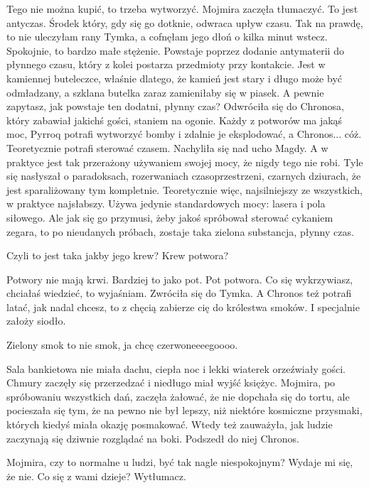 \ds{} Tego nie można kupić, to trzeba wytworzyć. \dm{} Mojmira zaczęła tłumaczyć. \dm{} To jest antyczas. Środek który, gdy się go dotknie, odwraca upływ czasu. 
Tak na prawdę, to nie uleczyłam rany Tymka, a cofnęłam jego dłoń o kilka minut wstecz. Spokojnie, to bardzo małe stężenie.
Powstaje poprzez dodanie antymaterii do płynnego czasu, który z kolei postarza przedmioty przy kontakcie. 
Jest w kamiennej buteleczce, właśnie dlatego, że kamień jest stary i długo może być odmładzany, a szklana butelka zaraz zamieniłaby się w piasek.
A pewnie zapytasz, jak powstaje ten dodatni, płynny czas? 
\dm{} Odwróciła się do Chronosa, który zabawiał jakichś gości, staniem na ogonie. \dm{} 
Każdy z potworów ma jakąś moc, Pyrroq potrafi wytworzyć bomby i zdalnie je eksplodować, a Chronos... cóż. Teoretycznie potrafi sterować czasem.
\dm{} Nachyliła się nad ucho Magdy. \dm{} A w praktyce jest tak przerażony używaniem swojej mocy, że nigdy tego nie robi.
Tyle się nasłyszał o paradoksach, rozerwaniach czasoprzestrzeni, czarnych dziurach, że jest sparaliżowany tym kompletnie.
Teoretycznie więc, najsilniejszy ze wszystkich, w praktyce najsłabszy.
Używa jedynie standardowych mocy: lasera i pola siłowego.
Ale jak się go przymusi, żeby jakoś spróbował sterować cykaniem zegara, to po nieudanych próbach, zostaje taka zielona substancja, płynny czas. \de{}

\ds{} Czyli to jest taka jakby jego krew? Krew potwora? \de{}

\ds{} Potwory nie mają krwi. Bardziej to jako pot. Pot potwora. Co się wykrzywiasz, chciałaś wiedzieć, to wyjaśniam. \dm{} Zwróciła się do Tymka. \dm{}
A Chronos też potrafi latać, jak nadal chcesz, to z chęcią zabierze cię do królestwa smoków. I specjalnie założy siodło. \de{}

\ds{} Zielony smok to nie smok, ja chcę czerwoneeeegoooo. \de{}

\divider{}

Sala bankietowa nie miała dachu, ciepła noc i lekki wiaterek orzeźwiały gości.
Chmury zaczęły się przerzedzać i niedługo miał wyjść księżyc.
Mojmira, po spróbowaniu wszystkich dań, zaczęła żałować, że nie dopchała się do tortu, ale pocieszała się tym, 
że na pewno nie był lepszy, niż niektóre kosmiczne przysmaki, których kiedyś miała okazję posmakować.
Wtedy też zauważyła, jak ludzie zaczynają się dziwnie rozglądać na boki. 
Podszedł do niej Chronos.

\ds{} Mojmira, czy to normalne u ludzi, być tak nagle niespokojnym? Wydaje mi się, że nie. Co się z wami dzieje? Wytłumacz. \de{}

